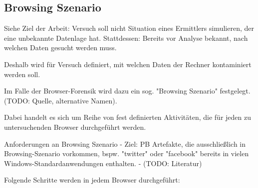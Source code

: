 \subsection{Browsing Szenario}


Siehe Ziel der Arbeit: Versuch soll nicht Situation eines Ermittlers simulieren, der eine unbekannte Datenlage hat.
Stattdessen: Bereits vor Analyse bekannt, nach welchen Daten gesucht werden muss.

Deshalb wird für Versuch definiert, mit welchen Daten der Rechner kontaminiert werden soll.

Im Falle der Browser-Forensik wird dazu ein sog. "Browsing Szenario" festgelegt. (TODO: Quelle, alternative Namen).

Dabei handelt es sich um Reihe von fest definierten Aktivitäten, die für jeden zu untersuchenden Browser durchgeführt werden.

Anforderungen an Browsing Szenario 
- Ziel: PB Artefakte, die ausschließlich in Browsing-Szenario vorkommen, bspw. "twitter" oder "facebook" bereits in vielen Windows-Standardanwendungen enthalten.
- (TODO: Literatur)

Folgende Schritte werden in jedem Browser durchgeführt: 

